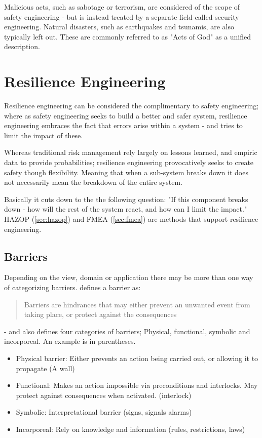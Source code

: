 \documentclass[10pt,oneside]{book}                  %
\begin{document}
Malicious acts, such as sabotage or terrorism, are considered of the scope of safety engineering - but is instead treated by a separate field called security engineering. Natural disasters, such as earthquakes and tsunamis, are also typically left out. These are commonly referred to as "Acts of God" as a unified description.
\section{Resilience Engineering}
\label{sec:resilience_engineering}
Resilience engineering can be considered the complimentary to safety engineering; where as safety engineering seeks to build a better and safer system, resilience engineering embraces the fact that errors arise within a system - and tries to limit the impact of these.

Whereas traditional risk management rely largely on lessons learned, and empiric data to provide probabilities; resilience engineering provocatively seeks to create safety though flexibility. Meaning that when a sub-system breaks down it does not necessarily mean the breakdown of the entire system.


Basically it cuts down to the the following question: "If this component breaks down - how will the rest of the system react, and how can I limit the impact." HAZOP (\ref{sec:hazop}) and FMEA (\ref{sec:fmea}) are methods that support resilience engineering.

\subsection{Barriers}
\label{sec:barriers}
Depending on the view, domain or application there may be more than one way of categorizing barriers.\cite{hollnagel2004barriers} defines a barrier as:
\begin{quote}
Barriers are hindrances that may either prevent an unwanted event from taking place, or protect against the consequences
\end{quote}
- and also defines four categories of barriers; Physical, functional, symbolic and incorporeal. An example is in parentheses.

\begin{itemize}
  \item Physical barrier: Either prevents an action being carried out, or allowing it to propagate (A wall)
  \item Functional: Makes an action impossible via preconditions and interlocks. May protect against consequences when activated. (interlock)
  \item Symbolic: Interpretational barrier (signs, signals alarms)
  \item Incorporeal: Rely on knowledge and information (rules, restrictions, laws)

\end{itemize}
\end{document}
